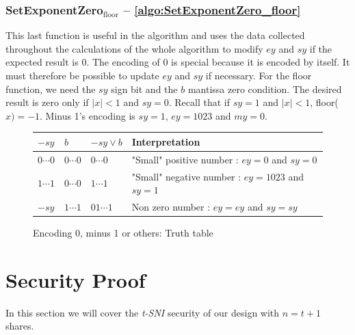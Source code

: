 \documentclass[runningheads]{llncs}
\begin{document}
    \subsubsection{SetExponentZero$_\text{floor}$ -- \autoref{algo:SetExponentZero_floor}}

    This last function is useful in the algorithm and uses the data collected throughout the calculations of the whole algorithm to modify $ey$ and $sy$ if the expected result is 0.
      The encoding of $0$ is special because it is encoded by itself. It must therefore be possible to update $ey$ and $sy$ if necessary. 
      For the floor function, we need the $sy$ sign bit and the $b$ mantissa zero condition.
      The desired result is zero only if $\mid x \mid <1$ and $sy=0$. Recall that if $sy=1$ and $\mid x \mid <1$, floor($x)=-1$. 
      Minus 1's encoding is $sy = 1$, $ey = 1023$ and $my = 0$.

      \begin{figure}
        \begin{center}
            \begin{tabular}{C{1.2cm} C{1.2cm} || C{2 cm} C{7.5cm}}
                \toprule
                 $-sy$ & $b$ &$-sy \vee b$ & Interpretation\\
                \midrule
                $0\cdots0$ & $0\cdots0$ & $0\cdots0$ & "Small" positive number : $ey = 0$ and $sy = 0$  \\
                $1\cdots1$ & $0\cdots0$ & $1\cdots1$ & "Small" negative number : $ey = 1023$ and $sy = 1$\\ 
                $-sy$ & $1\cdots1$ & $01\cdots1$ & Non zero number : $ey = ey$ and $sy=sy$\\
                \bottomrule
            \end{tabular}
        \end{center}
        \caption{Encoding 0, minus 1 or others: Truth table}
        \label{figure:flooradjust2}
    \end{figure}

\section{Security Proof}\label{sec:security}
In this section we will cover the \emph{t-SNI} security of our design with $n=t+1$ shares.
\end{document}
